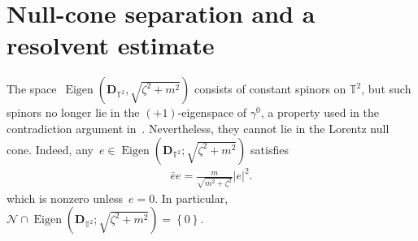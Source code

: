 \documentclass[10pt,a4paper]{amsart}
\newcommand{\T}{\mathbb{T}}
\newcommand{\pD}{\mathbf{D}}
\newcommand{\braces}[1]{\left\{#1\right\}} %
\DeclareMathOperator{\Eigen}{Eigen}
\begin{document}
\section{Null-cone separation and a resolvent estimate}\label{sect:key lemma}

The space~$\Eigen(\pD_{\T^2}, \sqrt{\zeta^2+m^2})$ consists of constant spinors on $\mathbb{T}^2$, but such spinors no longer lie in the $(+1)$-eigenspace of $\gamma^0$, a property used in the contradiction argument in~\cite{WZ2026Stationary}.
Nevertheless, they cannot lie in the Lorentz null cone.  
Indeed, any~$e\in\Eigen(\pD_{\T^2};\sqrt{\zeta^2+m^2})$ satisfies
\begin{align}
    \bar{e}e=\frac{m}{\sqrt{m^2+\zeta^2}}|e|^2.
\end{align}
which is nonzero unless~$e=0$. 
In particular,~$\mathcal{N}\cap \Eigen(\pD_{\T^2};\sqrt{\zeta^2+m^2})=\braces{0}$.  
\end{document}
